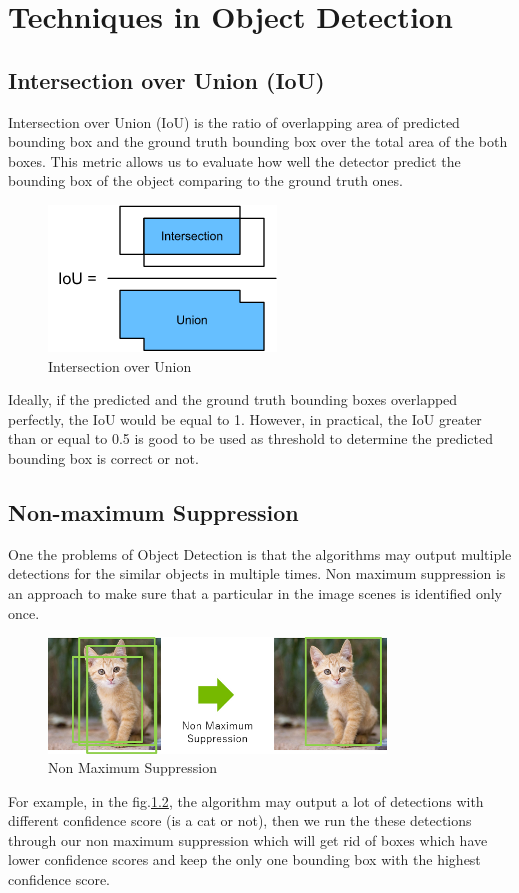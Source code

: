 \chapter{Techniques in Object Detection}

\section{Intersection over Union (IoU)}
\hspace{0.5cm}Intersection over Union (IoU) is the ratio of overlapping area of predicted bounding box and the ground truth bounding box over the total area of the both boxes. This metric allows us to evaluate how well the detector predict the bounding box of the object comparing to the ground truth ones.
\begin{figure}[h!]
    \centering
    \includegraphics[scale=1]{Chapters/Fig/iou.png}
    \caption{Intersection over Union}
    \label{fig:iou}
\end{figure}\par

Ideally, if the predicted and the ground truth bounding boxes overlapped perfectly, the IoU would be equal to 1. However, in practical, the IoU greater than or equal to 0.5 is good to be used as threshold to determine the predicted bounding box is correct or not.
\section{Non-maximum Suppression}
\hspace{0.5cm}One the problems of Object Detection is that the algorithms may output multiple detections for the similar objects in multiple times. Non maximum suppression is an approach to make sure that a particular in the image scenes is identified only once.
\begin{figure}[h!]
    \centering
    \includegraphics[width=0.8\textwidth]{Chapters/Fig/nms.png}
    \caption{Non Maximum Suppression}
    \label{fig:nms}
\end{figure}\par
For example, in the fig.\ref{fig:nms}, the algorithm may output a lot of detections with different confidence score (is a cat or not), then we run the these detections through our non maximum suppression which will get rid of boxes which have lower confidence scores and keep the only one bounding box with the highest confidence score.
